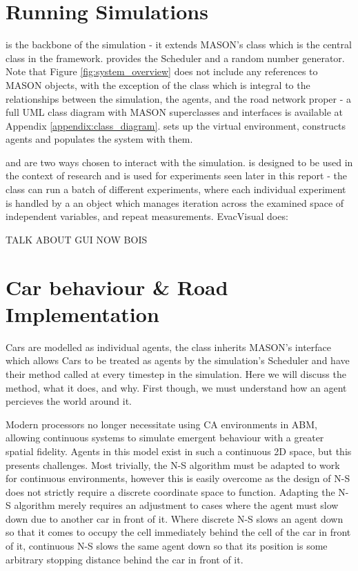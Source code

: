 
\section{Running Simulations}

 is the backbone of the simulation - it extends MASON's  class which is the central class in the framework.  provides the Scheduler and a random number generator. Note that Figure \ref{fig:system_overview} does not include any references to MASON objects, with the exception of the  class which is integral to the relationships between the simulation, the agents, and the road network proper - a full UML class diagram with MASON superclasses and interfaces is available at Appendix \ref{appendix:class_diagram}.  sets up the virtual environment, constructs agents and populates the system with them.

 and  are two ways chosen to interact with the simulation.  is designed to be used in the context of research and is used for experiments seen later in this report - the class can run a batch of different experiments, where each individual experiment is handled by a an  object which manages iteration across the examined space of independent variables, and repeat measurements. EvacVisual does:

TALK ABOUT GUI NOW BOIS
\section{Car behaviour \& Road Implementation}

Cars are modelled as individual agents, the  class inherits MASON's  interface which allows Cars to be treated as agents by the simulation's Scheduler and have their  method called at every timestep in the simulation. Here we will discuss the  method, what it does, and why. First though, we must understand how an agent percieves the world around it.

Modern processors no longer necessitate using CA environments in ABM, allowing continuous systems to simulate emergent behaviour with a greater spatial fidelity. Agents in this model exist in such a continuous 2D space, but this presents challenges. Most trivially, the N-S algorithm must be adapted to work for continuous environments, however this is easily overcome as the design of N-S does not strictly require a discrete coordinate space to function. Adapting the N-S algorithm merely requires an adjustment to cases where the agent must slow down due to another car in front of it. Where discrete N-S slows an agent down so that it comes to occupy the cell immediately behind the cell of the car in front of it, continuous N-S slows the same agent down so that its position is some arbitrary stopping distance behind the car in front of it.

